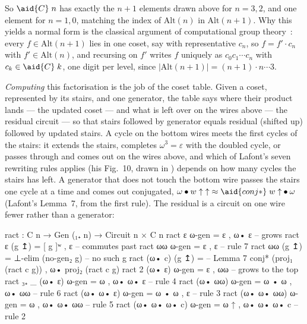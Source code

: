 \noindent So $\aid{C}\;n$ has exactly the $n{+}1$ elements drawn above for $n = 3, 2$, and one element for $n = 1, 0$, matching the index of $\mathrm{Alt}(n)$ in $\mathrm{Alt}(n{+}1)$. Why this yields a normal form is the classical argument of computational group theory~\cite{sims1994computation,holt2005handbook}: every $f \in \mathrm{Alt}(n{+}1)$ lies in one coset, say with representative $c_n$, so $f = f' \cdot c_n$ with $f' \in \mathrm{Alt}(n)$, and recursing on $f'$ writes $f$ uniquely as $c_0 c_1 \cdots c_n$ with $c_k \in \aid{C}\;k$, one digit per level, since $|\mathrm{Alt}(n{+}1)| = (n{+}1) \cdot n \cdots 3$.

\emph{Computing} this factorisation is the job of the coset table. Given a coset, represented by its stairs, and one generator, the table says where their product lands --- the updated coset --- and what is left over on the wires above --- the residual circuit --- so that stairs followed by generator equals residual (shifted up) followed by updated stairs. A cycle on the bottom wires meets the first cycles of the stairs: it extends the stairs, completes $\omega^3 = \varepsilon$ with the doubled cycle, or passes through and comes out on the wires above, and which of Lafont's seven rewriting rules applies (his Fig.~10, drawn in ) depends on how many cycles the stairs has left. A generator that does not touch the bottom wire passes the stairs one cycle at a time and comes out conjugated, $\omega \bullet w\;{\uparrow}\;{\uparrow} \approx \aid{conj*}\;w\;{\uparrow} \bullet \omega$ (Lafont's Lemma~7, from the first rule). The residual is a circuit on one wire fewer rather than a generator:
\begin{code}
ract : C n → Gen (₁₊ n) → Circuit n × C n
ract ε             ω-gen = ε , ω• ε             -- grows
ract ε             (g ↥) = [ g ]ʷ , ε           -- commutes past
ract ωω            ω-gen = ε , ε                -- rule 7
ract ωω            (g ↥) = ⊥-elim (no-gen₂ g)   -- no such g
ract (ω• c)        (g ↥) =                      -- Lemma 7
  conj* (proj₁ (ract c g)) , ω• proj₂ (ract c g)
ract {2}    (ω• ε) ω-gen = ε , ωω               -- grows to the top
ract {₃₊ _} (ω• ε) ω-gen = ω , ω• ω• ε          -- rule 4
ract (ω• ωω)       ω-gen = ω • ω , ω• ωω        -- rule 6
ract (ω• ω• ε)     ω-gen = ω • ω , ε            -- rule 3
ract (ω• ω• ωω)    ω-gen = ω , ω• ω• ωω         -- rule 5
ract (ω• ω• ω• c)  ω-gen = ω ↑ , ω• ω• ω• c     -- rule 2
\end{code}

